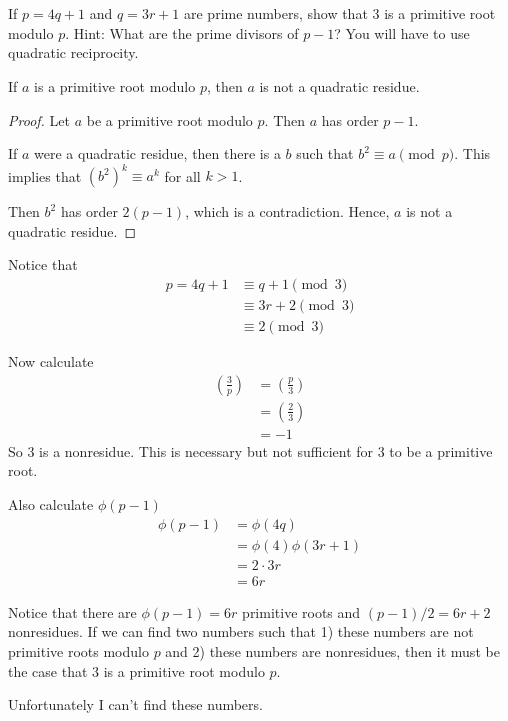 \section{}

If $p = 4q+1$ and $q = 3r + 1$ are prime numbers, show that $3$ is a primitive
root modulo $p$. Hint: What are the prime divisors of $p-1$? You will have to
use quadratic reciprocity.

\begin{lemma}
If $a$ is a primitive root modulo $p$, then $a$ is not a quadratic residue. 
\end{lemma}
\begin{proof}
Let $a$ be a primitive root modulo $p$. Then $a$ has order $p-1$.

If $a$ were a quadratic residue, then there is a $b$ such that 
$b^2 \equiv a \pmod p$. This implies that $(b^2)^k \equiv a^k$ for all $k > 1$.

Then $b^2$ has order $2(p-1)$, which is a contradiction. Hence, $a$ is not a
quadratic residue.
\end{proof}


Notice that 
\begin{align*}
p = 4q+1 &\equiv q + 1 \pmod 3 \\
   	 	 &\equiv 3r + 2 \pmod 3 \\
   	 	 &\equiv 2	   \pmod 3
\end{align*}

Now calculate
\begin{align*}
	\left( \frac{3}{p} \right) &= \left( \frac{p}{3} \right) \\
				 			   &= \left( \frac{2}{3} \right) \\
	 						   &= -1
\end{align*}
So 3 is a nonresidue. This is necessary but not sufficient for 3 to be a
primitive root.

Also calculate $\phi(p-1)$
\begin{align*}
	\phi(p-1) &= \phi(4q) \\
			  &= \phi(4) \phi(3r+1)	\\
			  &= 2 \cdot 3r \\
			  &= 6r
\end{align*}

Notice that there are $\phi(p-1)=6r$ primitive roots and $(p-1)/2 = 6r+2$ 
nonresidues. If we can find two numbers such that 1) these numbers are not
primitive roots modulo $p$ and 2) these numbers are nonresidues, then it
must be the case that 3 is a primitive root modulo $p$.

Unfortunately I can't find these numbers.